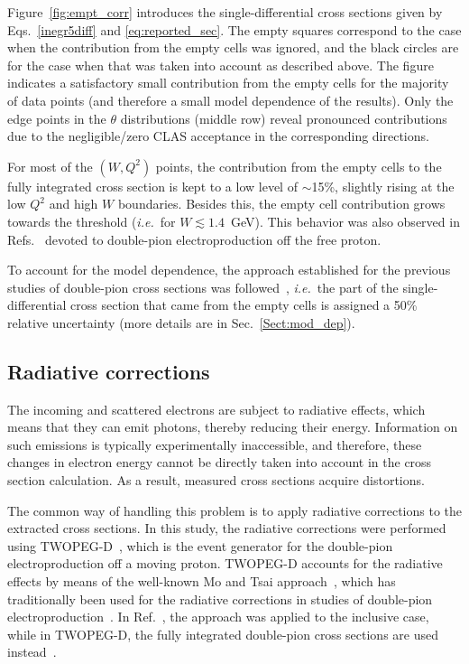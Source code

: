 \documentclass[prc,twocolumn,superscriptaddress,showpacs,amssymb,amsmath,amsfonts,aps,nofootinbib]{revtex4-1}
\begin{document}


Figure~\ref{fig:empt_corr} introduces the single-differential cross sections given by Eqs.\!~\eqref{inegr5diff} and \eqref{eq:reported_sec}. The empty squares correspond to the case when the contribution from the empty cells was ignored, and the black circles are for the case when that was taken into account as described above. The figure indicates a satisfactory small contribution from the empty cells for the majority of data points (and therefore a small model dependence of the results). Only the edge points in the $\theta$ distributions (middle row) reveal pronounced contributions due to the negligible/zero CLAS acceptance in the corresponding directions.

For most of the $(W,Q^2)$ points, the contribution from the empty cells to the fully integrated cross section is kept to a low level of $\sim$15\%, slightly rising at the low $Q^{2}$ and high $W$ boundaries. Besides this, the empty cell contribution grows towards the threshold ({\it i.e.}~for $W\lesssim 1.4$~GeV). This behavior was also observed in Refs.\!~\cite{Fed_an_note:2017,Fed_paper_2018,Fed_an_note:2007,Fedotov:2008aa} devoted to double-pion electroproduction off the free proton.

To account for the model dependence, the approach established for the previous studies of double-pion cross sections was followed~\cite{Isupov:2017lnd,Fed_an_note:2017,Golovach}, {\it i.e.}~the part of the single-differential cross section that came from the empty cells is assigned a 50\% relative uncertainty (more details are in Sec.\!~\ref{Sect:mod_dep}).


\subsection{Radiative corrections}
\label{Sect:rad_corr}

The incoming and scattered electrons are subject to radiative effects, which means that they can emit photons, thereby reducing their energy. Information on such emissions is typically experimentally inaccessible, and therefore, these changes in electron energy cannot be directly taken into account in the cross section calculation. As a result, measured cross sections acquire distortions.


The common way of handling this problem is to apply radiative corrections to the extracted cross sections. In this study, the radiative corrections were performed using TWOPEG-D~\cite{twopeg-d}, which is the event generator for the double-pion electroproduction off a moving proton. TWOPEG-D accounts for the radiative effects by means of the well-known Mo and Tsai approach~\cite{Mo:1968cg}, which has traditionally been used for the radiative corrections in studies of double-pion electroproduction~\cite{Rip_an_note:2002,Ripani:2002ss,Fed_an_note:2007,Fedotov:2008aa,Fed_an_note:2017,Fed_paper_2018,Isupov:2017lnd,Arjun}. In Ref.\!~\cite{Mo:1968cg}, the approach was applied to the inclusive case, while in TWOPEG-D, the fully integrated double-pion cross sections are used instead~\cite{twopeg,twopeg-d}. 
\end{document}
